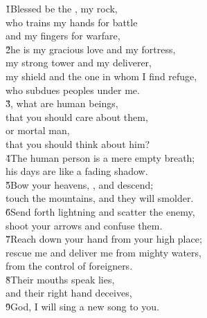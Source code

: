 \begin{poetry}
\poeml \v{1}Blessed be the , my rock, \\
\poemll    who trains my hands for battle \\
\poemlll       and my fingers for warfare, \\
\poeml \v{2}he is my gracious love and my fortress, \\
\poemll    my strong tower and my deliverer, \\
\poeml my shield and the one in whom I find refuge, \\
\poemll    who subdues peoples under me. \\
\poeml \v{3}, what are human beings, \\
\poemll    that you should care about them, \\
\poeml or mortal man, \\
\poemll    that you should think about him? \\
\poeml \v{4}The human person is a mere empty breath; \\
\poemll    his days are like a fading shadow. \\
\poeml \v{5}Bow your heavens, , and descend; \\
\poemll    touch the mountains, and they will smolder. \\
\poeml \v{6}Send forth lightning and scatter the enemy, \\
\poemll    shoot your arrows and confuse them. \\
\poeml \v{7}Reach down your hand from your high place; \\
\poemll    rescue me and deliver me from mighty waters, \\
\poemlll       from the control of foreigners. \\
\poeml \v{8}Their mouths speak lies, \\
\poemll    and their right hand deceives, \\
\poeml \v{9}God, I will sing a new song to you. \\

\end{poetry}
